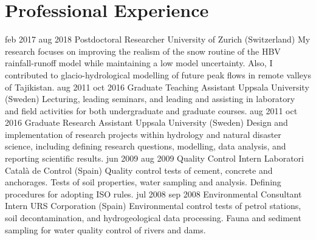     \section{Professional Experience}
        \position
            {feb 2017 \textemdash{} aug 2018}
            {Postdoctoral Researcher}
            {University of Zurich (Switzerland)}
            {My research focuses on improving the realism of the snow routine of the HBV rainfall-runoff model while maintaining a low model uncertainty. Also, I contributed to glacio-hydrological modelling of future peak flows in remote valleys of Tajikistan.}
        \position
            {aug 2011 \textemdash{} oct 2016}
            {Graduate Teaching Assistant}
            {Uppsala University (Sweden)}
            {Lecturing, leading seminars, and leading and assisting in laboratory and field activities for both undergraduate and graduate courses.}
        \position
            {aug 2011 \textemdash{} oct 2016}
            {Graduate Research Assistant}
            {Uppsala University (Sweden)}
            {Design and implementation of research projects within hydrology and natural disaster science, including defining research questions, modelling, data analysis, and reporting scientific results.}
        \position
            {jun 2009 \textemdash{} aug 2009}
            {Quality Control Intern}
            {Laboratori Català de Control (Spain)}
            {Quality control tests of cement, concrete and anchorages. Tests of soil properties, water sampling and analysis. Defining procedures for adopting ISO rules.}
        \position
            {jul 2008 \textemdash{} sep 2008}
            {Environmental Consultant Intern}
            {URS Corporation (Spain)}
            {Environmental control tests of petrol stations, soil decontamination, and hydrogeological data processing. Fauna and sediment sampling for water quality control of rivers and dams.}
\fi
